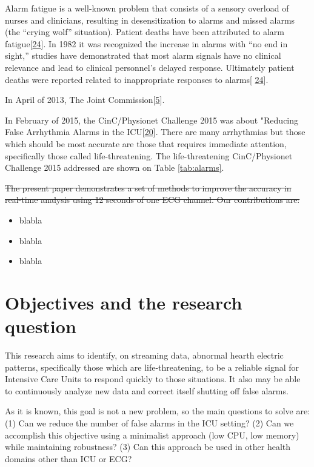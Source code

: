 \documentclass[
]{article}
\providecommand{\tightlist}{%
  \setlength{\itemsep}{0pt}\setlength{\parskip}{0pt}}
\begin{document}
Alarm fatigue is a well-known problem that consists of a sensory
overload of nurses and clinicians, resulting in desensitization to
alarms and missed alarms (the ``crying wolf'' situation). Patient deaths
have been attributed to alarm
fatigue{[}\protect\hyperlink{ref-sendelbach2013}{24}{]}. In 1982 it was
recognized the increase in alarms with {``no end in sight,''} studies
have demonstrated that most alarm signals have no clinical relevance and
lead to clinical personnel's delayed response. Ultimately patient deaths
were reported related to inappropriate responses to alarms{[}
\protect\hyperlink{ref-sendelbach2013}{24}{]}.

In April of 2013, The Joint
Commission{[}\protect\hyperlink{ref-the_jc2021}{5}{]}.

In February of 2015, the CinC/Physionet Challenge 2015 was about
"Reducing False Arrhythmia Alarms in the
ICU{[}\protect\hyperlink{ref-Lawless1994}{20}{]}. There are many
arrhythmias but those which should be most accurate are those that
requires immediate attention, specifically those called
life-threatening. The life-threatening CinC/Physionet Challenge 2015
addressed are shown on Table \ref{tab:alarms}.

\sout{The present paper demonstrates a set of methods to improve the
accuracy in real-time analysis using 12 seconds of one ECG channel. Our
contributions are:}

\begin{itemize}
\tightlist
\item
  blabla
\item
  blabla
\item
  blabla
\end{itemize}

\hypertarget{objectives-and-the-research-question}{%
\section{Objectives and the research
question}\label{objectives-and-the-research-question}}

This research aims to identify, on streaming data, abnormal hearth
electric patterns, specifically those which are life-threatening, to be
a reliable signal for Intensive Care Units to respond quickly to those
situations. It also may be able to continuously analyze new data and
correct itself shutting off false alarms.

As it is known, this goal is not a new problem, so the main questions to
solve are: (1) Can we reduce the number of false alarms in the ICU
setting? (2) Can we accomplish this objective using a minimalist
approach (low CPU, low memory) while maintaining robustness? (3) Can
this approach be used in other health domains other than ICU or ECG?
\end{document}
